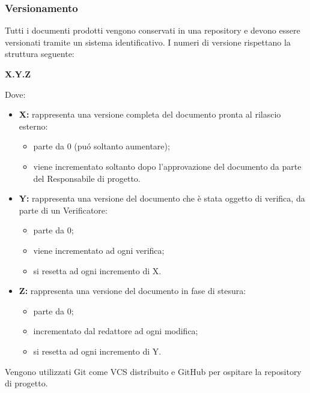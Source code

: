     \subsubsection{Versionamento}
        Tutti i documenti prodotti vengono conservati in una repository e devono essere versionati tramite un sistema identificativo. I numeri di versione rispettano la struttura seguente:
        \begin{center}
          \textbf{X.Y.Z}
        \end{center}
        Dove:
        \begin{itemize}
          \item \textbf{X:} rappresenta una versione completa del documento pronta al rilascio esterno:
            \begin{itemize}
              \item parte da 0 (puó soltanto aumentare);
              \item viene incrementato soltanto dopo l'approvazione del documento da parte del Responsabile di progetto.
            \end{itemize}
          \item \textbf{Y:} rappresenta una versione del documento che è stata oggetto di verifica, da parte di un Verificatore:
            \begin{itemize}
              \item parte da 0;
              \item viene incrementato ad ogni verifica;
              \item si resetta ad ogni incremento di X.
            \end{itemize}
          \item \textbf{Z:} rappresenta una versione del documento in fase di stesura:
            \begin{itemize}
              \item parte da 0;
              \item incrementato dal redattore ad ogni modifica;
              \item si resetta ad ogni incremento di Y.
            \end{itemize}
        \end{itemize}

        Vengono utilizzati Git come VCS distribuito e GitHub per ospitare la repository di progetto.

